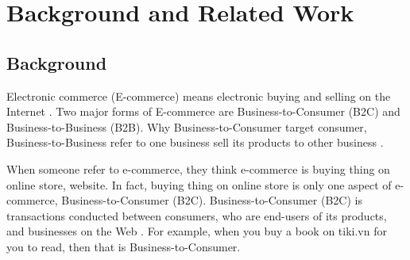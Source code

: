 \documentclass[conference]{IEEEtran}
\begin{document}
%




\section{Background and Related Work} \label{background}
\subsection{Background}
Electronic commerce (E-commerce) means electronic buying and selling on the Internet \cite{bidgoli2002electronic}. Two major forms of E-commerce are Business-to-Consumer (B2C) and Business-to-Business (B2B). Why Business-to-Consumer target consumer, Business-to-Business refer to one business sell its products to other business \cite{readingEcommerce2009}.

When someone refer to e-commerce, they think e-commerce is buying thing on online store, website. In fact, buying thing on online store is only one aspect of e-commerce, Business-to-Consumer (B2C). Business-to-Consumer (B2C) is transactions conducted between consumers, who are end-users of its products, and businesses on the Web \cite{ec2010Gary}. For example, when you buy a book on tiki.vn for you to read, then that is Business-to-Consumer.
\end{document}
